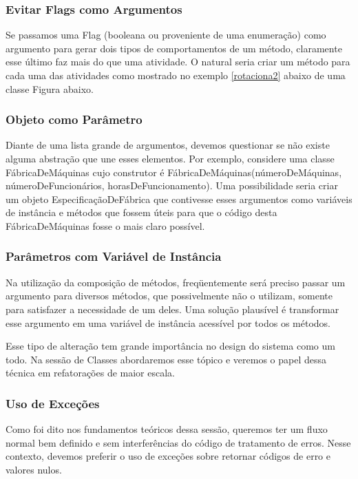 \subsubsection{Evitar Flags como Argumentos}
Se passamos uma Flag (booleana ou proveniente de uma enumeração) como argumento para gerar dois tipos de comportamentos de um método, claramente esse último faz mais do que uma atividade. O natural seria criar um método para cada uma das atividades como mostrado no exemplo \ref{rotaciona2} abaixo de uma classe Figura abaixo.




\subsubsection{Objeto como Parâmetro}
Diante de uma lista grande de argumentos, devemos questionar se não existe alguma abstração que une esses elementos. Por exemplo, considere uma classe FábricaDeMáquinas cujo construtor é FábricaDeMáquinas(númeroDeMáquinas, númeroDeFuncionários, horasDeFuncionamento). Uma possibilidade seria criar um objeto EspecificaçãoDeFábrica que contivesse esses argumentos como variáveis de instância e métodos que fossem úteis para que o código desta FábricaDeMáquinas fosse o mais claro possível.

\subsubsection{Parâmetros com Variável de Instância}
Na utilização da composição de métodos, freqüentemente será preciso passar um argumento para diversos métodos, que possivelmente não o utilizam, somente para satisfazer a necessidade de um deles. Uma solução plausível é transformar esse argumento em uma variável de instância acessível por todos os métodos.
	
Esse tipo de alteração tem grande importância no design do sistema como um todo. Na sessão de Classes abordaremos esse tópico e veremos o papel dessa técnica em refatorações de maior escala.

\subsubsection{Uso de Exceções}
Como foi dito nos fundamentos teóricos dessa sessão, queremos ter um fluxo normal bem definido e sem interferências do código de tratamento de erros. Nesse contexto, devemos preferir o uso de exceções sobre retornar códigos de erro e valores nulos.
	
